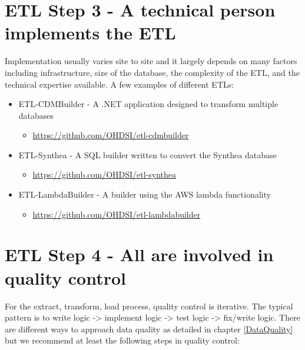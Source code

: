 \documentclass[11pt]{book}
\providecommand{\tightlist}{%
  \setlength{\itemsep}{0pt}\setlength{\parskip}{0pt}}
\theoremstyle{definition}
\theoremstyle{definition}
\theoremstyle{definition}
\theoremstyle{remark}
\begin{document}
\hypertarget{etl-step-3---a-technical-person-implements-the-etl}{%
\section{ETL Step 3 - A technical person implements the ETL}\label{etl-step-3---a-technical-person-implements-the-etl}}

Implementation usually varies site to site and it largely depends on many factors including infrastructure, size of the database, the complexity of the ETL, and the technical expertise available. A few examples of different ETLs:

\begin{itemize}
\tightlist
\item
  ETL-CDMBuilder - A .NET application designed to transform multiple databases

  \begin{itemize}
  \tightlist
  \item
    \url{https://github.com/OHDSI/etl-cdmbuilder}
  \end{itemize}
\item
  ETL-Synthea - A SQL builder written to convert the Synthea database

  \begin{itemize}
  \tightlist
  \item
    \url{https://github.com/OHDSI/etl-synthea}
  \end{itemize}
\item
  ETL-LambdaBuilder - A builder using the AWS lambda functionality

  \begin{itemize}
  \tightlist
  \item
    \url{https://github.com/OHDSI/etl-lambdabuilder}
  \end{itemize}
\end{itemize}

\hypertarget{etl-step-4---all-are-involved-in-quality-control}{%
\section{ETL Step 4 - All are involved in quality control}\label{etl-step-4---all-are-involved-in-quality-control}}

For the extract, transform, load process, quality control is iterative. The typical pattern is to write logic -\textgreater{} implement logic -\textgreater{} test logic -\textgreater{} fix/write logic. There are different ways to approach data quality as detailed in chapter \ref{DataQuality} but we recommend at least the following steps in quality control:
\end{document}
